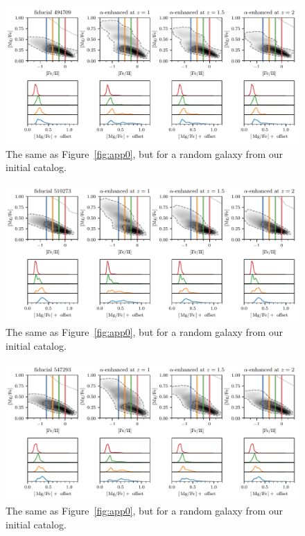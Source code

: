 \begin{appendices}
\begin{figure}
  \centering
  \includegraphics[width=\textwidth]{ch4/app_494709.pdf}
  \caption{The same as Figure~\ref{fig:app0}, but for a random galaxy from our initial catalog.}
  \label{fig:app13}
\end{figure}

\begin{figure}
  \centering
  \includegraphics[width=\textwidth]{ch4/app_510273.pdf}
  \caption{The same as Figure~\ref{fig:app0}, but for a random galaxy from our initial catalog.}
  \label{fig:app14}
\end{figure}

\begin{figure}
  \centering
  \includegraphics[width=\textwidth]{ch4/app_547293.pdf}
  \caption{The same as Figure~\ref{fig:app0}, but for a random galaxy from our initial catalog.}
  \label{fig:app15}
\end{figure}


\end{appendices}
